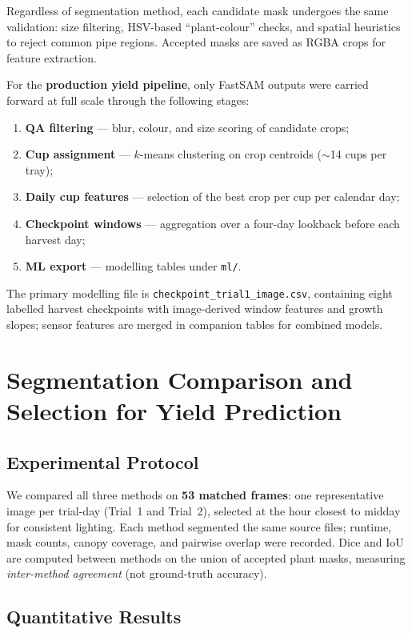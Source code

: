 Regardless of segmentation method, each candidate mask undergoes the same validation:
size filtering, HSV-based ``plant-colour'' checks, and spatial heuristics to reject common pipe
regions. Accepted masks are saved as RGBA crops for feature extraction.

\medskip

For the \textbf{production yield pipeline}, only FastSAM outputs were carried forward at full
scale through the following stages:
\begin{enumerate}
    \item \textbf{QA filtering} --- blur, colour, and size scoring of candidate crops;
    \item \textbf{Cup assignment} --- $k$-means clustering on crop centroids ($\sim$14 cups per tray);
    \item \textbf{Daily cup features} --- selection of the best crop per cup per calendar day;
    \item \textbf{Checkpoint windows} --- aggregation over a four-day lookback before each harvest day;
    \item \textbf{ML export} --- modelling tables under \texttt{ml/}.
\end{enumerate}
The primary modelling file is \texttt{checkpoint\_trial1\_image.csv}, containing eight labelled
harvest checkpoints with image-derived window features and growth slopes; sensor features are
merged in companion tables for combined models.


\section{Segmentation Comparison and Selection for Yield Prediction}
\label{sec:results_selection}

\subsection{Experimental Protocol}
\label{sec:protocol}

We compared all three methods on \textbf{53 matched frames}: one representative image per
trial-day (Trial~1 and Trial~2), selected at the hour closest to midday for consistent
lighting.
Each method segmented the same source files; runtime, mask counts, canopy coverage, and
pairwise overlap were recorded.
Dice and IoU are computed between methods on the union of accepted plant masks, measuring
\emph{inter-method agreement} (not ground-truth accuracy).

\subsection{Quantitative Results}
\label{sec:quant_results}

